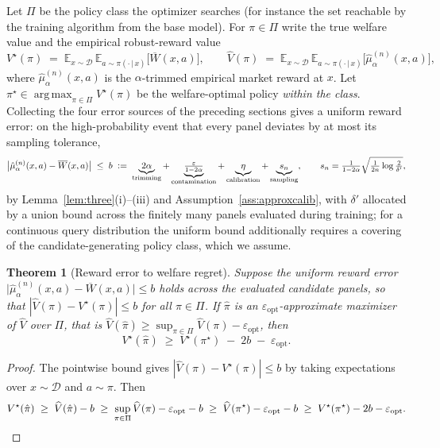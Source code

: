 \documentclass[11pt]{article}
\theoremstyle{plain}
\newtheorem{theorem}{Theorem}
\theoremstyle{definition}
\theoremstyle{remark}
\newcommand{\E}{\mathbb{E}}
\newcommand{\Dc}{\mathcal{D}}
\newcommand{\Wbar}{\overline{W}}
\newcommand{\given}{\,\vert\,}
\newcommand{\eps}{\varepsilon}
\DeclareMathOperator*{\argmax}{arg\,max}
\newcommand{\defeq}{\vcentcolon=}
\begin{document}
Let $\Pi$ be the policy class the optimizer searches (for instance the set reachable by the
training algorithm from the base model). For $\pi\in\Pi$ write the true welfare value and the
empirical robust-reward value
\[
  V^\star(\pi)\;=\;\E_{x\sim\Dc}\,\E_{a\sim\pi(\cdot\given x)}\big[\Wbar(x,a)\big],
  \qquad
  \widehat V(\pi)\;=\;\E_{x\sim\Dc}\,\E_{a\sim\pi(\cdot\given x)}\big[\hat\mu_\alpha^{(n)}(x,a)\big],
\]
where $\hat\mu_\alpha^{(n)}(x,a)$ is the $\alpha$-trimmed empirical market reward at $x$. Let
$\pi^\star\in\argmax_{\pi\in\Pi}V^\star(\pi)$ be the welfare-optimal policy \emph{within the
class}. Collecting the four error sources of the preceding sections gives a uniform reward error:
on the high-probability event that every panel deviates by at most its sampling tolerance,
\[
  \bigl|\hat\mu_\alpha^{(n)}(x,a)-\Wbar(x,a)\bigr|\;\le\;b
  \;\defeq\;\underbrace{2\alpha}_{\text{trimming}}
  +\underbrace{\tfrac{\eps}{1-2\alpha}}_{\text{contamination}}
  +\underbrace{\eta}_{\text{calibration}}
  +\underbrace{s_n}_{\text{sampling}},
  \qquad s_n=\tfrac{1}{1-2\alpha}\sqrt{\tfrac{1}{2n}\log\tfrac{2}{\delta'}},
\]
by Lemma~\ref{lem:three}(i)--(iii) and Assumption~\ref{ass:approxcalib}, with $\delta'$ allocated
by a union bound across the finitely many panels evaluated during training; for a continuous query
distribution the uniform bound additionally requires a covering of the candidate-generating policy
class, which we assume.

\begin{theorem}[Reward error to welfare regret]
\label{thm:regret}
Suppose the uniform reward error $\bigl|\hat\mu_\alpha^{(n)}(x,a)-\Wbar(x,a)\bigr|\le b$ holds
across the evaluated candidate panels, so that $|\widehat V(\pi)-V^\star(\pi)|\le b$ for all
$\pi\in\Pi$. If $\hat\pi$
is an $\eps_{\mathrm{opt}}$-approximate maximizer of $\widehat V$ over $\Pi$, that is
$\widehat V(\hat\pi)\ge\sup_{\pi\in\Pi}\widehat V(\pi)-\eps_{\mathrm{opt}}$, then
\[
  V^\star(\hat\pi)\;\ge\;V^\star(\pi^\star)\;-\;2b\;-\;\eps_{\mathrm{opt}}.
\]
\end{theorem}

\begin{proof}
The pointwise bound gives $|\widehat V(\pi)-V^\star(\pi)|\le b$ by taking expectations over
$x\sim\Dc$ and $a\sim\pi$. Then
\[
  V^\star(\hat\pi)\;\ge\;\widehat V(\hat\pi)-b
  \;\ge\;\sup_{\pi\in\Pi}\widehat V(\pi)-\eps_{\mathrm{opt}}-b
  \;\ge\;\widehat V(\pi^\star)-\eps_{\mathrm{opt}}-b
  \;\ge\;V^\star(\pi^\star)-2b-\eps_{\mathrm{opt}}. \qedhere
\]
\end{proof}
\end{document}
